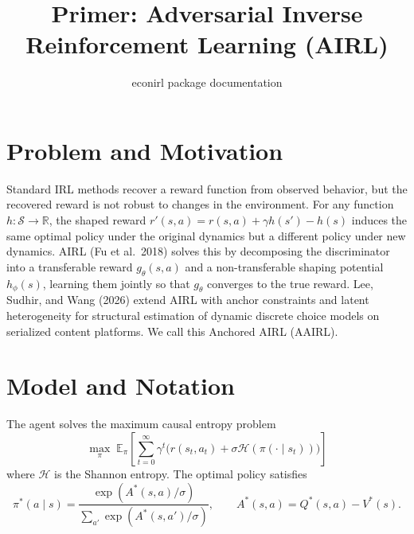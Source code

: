 \documentclass[11pt]{article}
\title{Primer: Adversarial Inverse Reinforcement Learning (AIRL)}
\author{econirl package documentation}
\date{}
\newcommand{\E}{\mathbb{E}}
\newcommand{\R}{\mathbb{R}}
\newcommand{\calS}{\mathcal{S}}
\newcommand{\calH}{\mathcal{H}}
\begin{document}
\maketitle

\section{Problem and Motivation}

Standard IRL methods recover a reward function from observed behavior, but the recovered reward is not robust to changes in the environment. For any function $h : \calS \to \R$, the shaped reward $r'(s,a) = r(s,a) + \gamma h(s') - h(s)$ induces the same optimal policy under the original dynamics but a different policy under new dynamics. AIRL (Fu et al.\ 2018) solves this by decomposing the discriminator into a transferable reward $g_\theta(s,a)$ and a non-transferable shaping potential $h_\phi(s)$, learning them jointly so that $g_\theta$ converges to the true reward. Lee, Sudhir, and Wang (2026) extend AIRL with anchor constraints and latent heterogeneity for structural estimation of dynamic discrete choice models on serialized content platforms. We call this Anchored AIRL (AAIRL).

\section{Model and Notation}

The agent solves the maximum causal entropy problem
\begin{equation}
\label{eq:objective}
\max_\pi \; \E_\pi\!\left[\sum_{t=0}^{\infty} \gamma^t \big(r(s_t, a_t) + \sigma \calH(\pi(\cdot \mid s_t))\big)\right]
\end{equation}
where $\calH$ is the Shannon entropy. The optimal policy satisfies
\begin{equation}
\label{eq:softmax}
\pi^*(a \mid s) = \frac{\exp(A^*(s,a)/\sigma)}{\sum_{a'} \exp(A^*(s,a')/\sigma)}, \qquad A^*(s,a) = Q^*(s,a) - V^*(s).
\end{equation}
\end{document}
